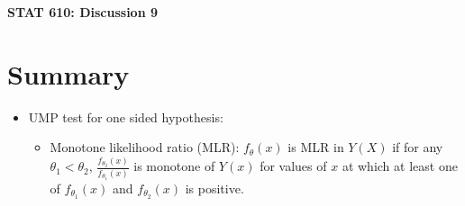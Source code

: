\documentclass[12pt]{extarticle}
\begin{document}
\begin{center}
{\large \bf STAT 610: Discussion 9}
\end{center}
\vspace{0.22cm}

\section{Summary}
\begin{itemize}
    \item UMP test for one sided hypothesis:
	\begin{itemize}
		\item Monotone likelihood ratio (MLR): $f_\theta(x)$ is MLR in $Y(X)$ if for any $\theta_1<\theta_2$, $\frac{f_{\theta_2}(x)}{f_{\theta_1}(x)}$ is monotone of $Y(x)$ for values of $x$ at which at least one of $f_{\theta_1}(x)$ and $f_{\theta_2}(x)$ is positive.
		

\end{itemize}
\end{itemize}
\end{document}
